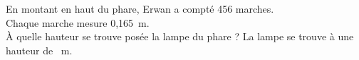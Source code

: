 En montant en haut du phare, Erwan a compté 456 marches.\\Chaque
marche mesure 0,165~m.
\\\`A quelle hauteur se trouve posée la lampe du phare ?
\kern2cm La lampe se trouve à une hauteur de ~m.
